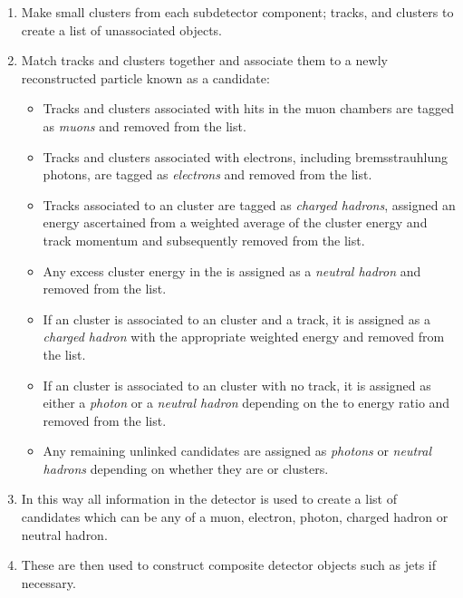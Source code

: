 \begin{enumerate}
  \item{Make small clusters from each subdetector component; tracks, \ECAL and \HCAL clusters to create a list of unassociated objects.}
  \item{Match tracks and clusters together and associate them to a newly reconstructed particle known as a \PF candidate:}
  \begin{itemize}
    \item{Tracks and clusters associated with hits in the muon chambers are tagged as \emph{muons} and removed from the list.}
    \item{Tracks and clusters associated with electrons, including bremsstrauhlung photons, are tagged as \emph{electrons} and removed from the list.}
    \item{Tracks associated to an \HCAL cluster are tagged as \emph{charged hadrons}, assigned an energy ascertained from a weighted average of the cluster energy and track momentum and subsequently removed from the list.}
    \item{Any excess cluster energy in the \HCAL is assigned as a \emph{neutral hadron} and removed from the list.}
    \item{If an \ECAL cluster is associated to an \HCAL cluster and a track, it is assigned as a \emph{charged hadron} with the appropriate weighted energy and removed from the list.}
    \item{If an \ECAL cluster is associated to an \HCAL cluster with no track, it is assigned as either a \emph{photon} or a \emph{neutral hadron} depending on the \HCAL to \ECAL energy ratio and removed from the list.}
    \item{Any remaining unlinked candidates are assigned as \emph{photons} or \emph{neutral hadrons} depending on whether they are \ECAL or \HCAL clusters.}
  \end{itemize}
  \item{In this way all information in the detector is used to create a list of candidates which can be any of a muon, electron, photon, charged hadron or neutral hadron.}
  \item{These are then used to construct composite detector objects such as jets if necessary.}
\end{enumerate}


